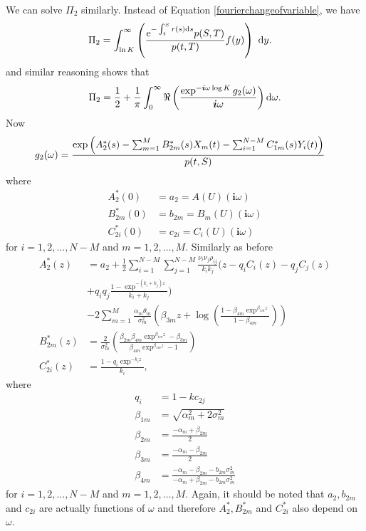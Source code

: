 We can solve $\Pi_2$ similarly. Instead of Equation \ref{fourierchangeofvariable}, we have
	\begin{align}
		\Pi_2 &= \int_{\ln K}^{\infty} \left( \frac{\mathrm{e}^{ - \int_t^S r(s) \mathrm{d} s } p(S,T) }{p(t,T)} f(y) \right) \ \mathrm{d} y .
	\end{align}
and similar reasoning shows that
	\begin{align}
		\Pi_2 = \frac{1}{2} + \frac{1}{\pi} \int_0^{\infty} \Re \left( \frac{\exp^{-\boldsymbol{i}\omega \log K} g_2(\omega)}{\boldsymbol{i} \omega} \right) \mathrm{d} \omega .
	\end{align}
Now
	\begin{align}
		g_2 (\omega) &= \frac{ \exp \left( A_2^*(s) - \sum_{m=1}^M B_{2m}^*(s) X_m(t) - \sum_{i=1}^{N-M} C_{1m}^*(s) Y_i(t)  \right) }{p(t,S)} 
	\end{align}	
where
\begin{align}
A_2^*(0) &= a_2 = A(U) ( \boldsymbol{i} \omega ) \\ 
B_{2m}^*(0) &= b_{2m} = B_m(U) ( \boldsymbol{i} \omega ) \\ 
C_{2i}^*(0) &= c_{2i} = C_i(U) ( \boldsymbol{i} \omega )
\end{align}
for $i= 1,2, \ldots, N-M$ and $m=1,2, \ldots , M$. Similarly as before 
\begin{align}
A_2^*(z) &= a_2  +  \frac{1}{2} \sum_{i=1}^{N-M} \sum_{j=1}^{N-M} \frac{\nu_i \nu_j \rho_{ij}}{k_ik_j} ( z - q_i C_i(z) - q_j C_j(z) \\ &+ q_iq_j \frac{1 - \exp^{ - (k_i+k_j)z } }{k_i+k_j} ) \\
&- 2 \sum_{m=1}^M \frac{\alpha_m \theta_m}{\sigma_m^2} \left( \beta_{3m} z + \log ( \frac{1 - \beta_ {4m} \exp^{ \beta_{1m} z } }{1 - \beta_{4m}} )  \right) \\
B_{2m}^*(z) &= \frac{2}{\sigma_m^2} \left( \frac{ \beta_{2m} \beta_{4m} \exp^{\beta_{1m} z} - \beta_{3m} }{ \beta_{4m} \exp^{\beta_{1m} z} - 1 } \right) \\
C_{2i}^* (z) &= \frac{1-q_i \exp^{-k_iz}}{k_i},
\end{align}
where
\begin{align}
q_i &= 1 - k c_{2j} \\
\beta_{1m} &= \sqrt{\alpha_m^2 + 2 \sigma_m^2} \\
\beta_{2m} &= \frac{- \alpha_m + \beta_{2m}}{2} \\
\beta_{3m} &= \frac{- \alpha_m - \beta_{2m}}{2} \\
\beta_{4m} &= \frac{ - \alpha_m - \beta_{2m} - b_{2m} \sigma_m^2 }{ - \alpha_m + \beta_{2m} - b_{2m} \sigma_m^2 }
\end{align}
for $i= 1,2, \ldots, N-M$ and $m=1,2, \ldots , M$. Again, it should be noted that $a_2, b_{2m}$ and $c_{2i}$ are actually functions of $\omega$ and therefore $A_2^*, B_{2m}^*$ and $C_{2i}^*$ also depend on $\omega$.
	
